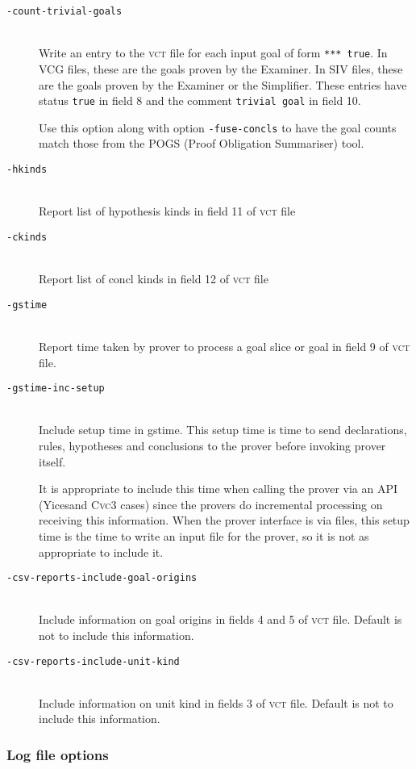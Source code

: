 \documentclass[12pt,fleqn]{article}
\newcommand{\cvcthree}{\textsc{Cvc}3}
\newcommand{\yices}{Yices}
\newcommand{\csv}{\textsc{vct}}
\newcommand{\optionb}[1]{\item[\texttt{-{#1}}]\ \\}
\begin{document}
\begin{description}

\optionb{count-trivial-goals}
   Write an entry to the \csv{} file for each input goal of form 
   \texttt{*** true}.
   In VCG files, these are the goals proven by the Examiner.
   In SIV files, these are the goals proven by the Examiner or the 
   Simplifier.
   These entries have status \texttt{true} in field 8 and
   the comment \texttt{trivial goal} in field 10.

   Use this option along with option \texttt{-fuse-concls} to have the
   goal counts match those from the POGS (Proof Obligation Summariser)
   tool.

\optionb{hkinds} Report list of hypothesis kinds in field 11 of \csv{} file
\optionb{ckinds} Report list of concl kinds in field 12 of \csv{} file
\optionb{gstime} 
  Report time taken by prover to process a goal slice or goal
       in field 9 of \csv{} file.
\optionb{gstime-inc-setup}
  Include setup time in gstime.  This setup time is time to 
  send declarations, rules, hypotheses and conclusions to the prover before
  invoking prover itself.  

  It is appropriate to include this time when calling the prover via 
  an API (\yices and \cvcthree{} cases) since
  the provers do incremental processing on receiving this information.
  When the prover interface is via files, this setup time is the time to 
  write an input file for the prover, so it is not as appropriate to include
  it.

\optionb{csv-reports-include-goal-origins}
  Include information on goal origins in fields 4 and 5 of \csv{} file.
  Default is not to include this information.

\optionb{csv-reports-include-unit-kind}
  Include information on unit kind in fields 3 of \csv{} file.
  Default is not to include this information.
\end{description}

\subsubsection{Log file options}
\end{document}
